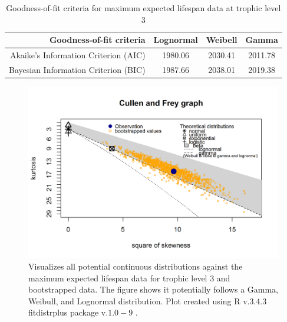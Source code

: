 \documentclass[oneside,12pt,final]{sty/ucthesis-CA2012}
\let\cite\citep                             %
\begin{document}
\begin{mainmatter}
\begin{table}[H]
\centering
\caption{Goodness-of-fit criteria for maximum expected lifespan data at trophic level 3}
\begin{tabular}{r|c|c|c}
  \hline \small
 Goodness-of-fit criteria & Lognormal & Weibell & Gamma \\ 
   \hline
   Akaike's Information Criterion (AIC) & 1980.06 & 2030.41 & 2011.78 \\   
   Bayesian Information Criterion (BIC) & 1987.66 & 2038.01 & 2019.38 \\
   \hline
\end{tabular} 
\label{l3_aic}
\end{table}

\begin{figure}[H]
     \centering
       \includegraphics[width=.8\textwidth]{fig/cullen_frey_l3}
    \caption{Visualizes all potential continuous distributions against the maximum expected lifespan data for trophic level 3 and bootstrapped data. The figure shows it potentially follows a Gamma, Weibull, and Lognormal distribution. Plot created using R v.3.4.3 \cite{Rcite} fitdistrplus package v.$1.0-9$ \cite{fitdistrplus}. }
    \label{cf_l3}
\end{figure}


\end{mainmatter}
\end{document}
